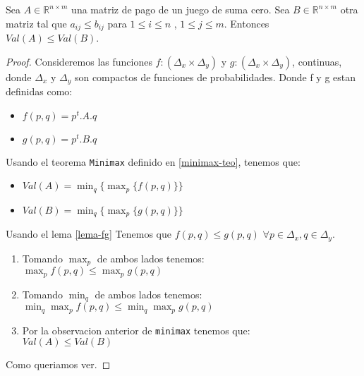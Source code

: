 \begin{theorem}
	Sea $A \in \mathbb{R}^{n \times m}$ una matriz de pago de un juego de suma cero. Sea $B \in \mathbb{R}^{n \times m}$ otra matriz tal que $a_{ij} \leq b_{ij}$ para $1 \leq i \leq n$   ,  $1 \leq j \leq m$. Entonces $Val(A) \leq Val(B)$.
\end{theorem}
\begin{proof}
	Consideremos las funciones $f:(\Delta_x \times \Delta_y)$ y $g:(\Delta_x \times \Delta_y)$, continuas, donde $\Delta_x$ y $\Delta_y$ son compactos de funciones de probabilidades. Donde f y g estan definidas como:
	\begin{itemize}
		\item $f(p, q) = p^t.A.q$ 
		\item $g(p, q) = p^t.B.q$ 
	\end{itemize}

	Usando el teorema \texttt{Minimax} definido en \ref{minimax-teo}, tenemos que:
	\begin{itemize}
		\item $Val(A) = \displaystyle\min_{q} \{    \displaystyle\max_{p} \{  f(p, q) \}    \}$
		\item $Val(B) = \displaystyle\min_{q} \{    \displaystyle\max_{p} \{  g(p, q) \}    \}$
	\end{itemize}

	Usando el lema \ref{lema-fg} Tenemos que $f(p, q) \leq g(p, q)$   $\forall p \in \Delta_x, q \in \Delta_y$.\\


\begin{enumerate}
	\item Tomando $\displaystyle\max_{p}$ de ambos lados tenemos:\\
	$ \displaystyle\max_{p} f(p, q) \leq  \displaystyle\max_{p} g(p, q)$
	
	\item Tomando $\displaystyle\min_{q}$ de ambos lados tenemos:\\
	$ \displaystyle\min_{q} \displaystyle\max_{p} f(p, q) \leq  \displaystyle\min_{q} \displaystyle\max_{p} g(p, q)$

	\item Por la observacion anterior de \texttt{minimax} tenemos que:\\
	$ Val(A) \leq Val(B)$
\end{enumerate}
Como queriamos ver.



\end{proof}





